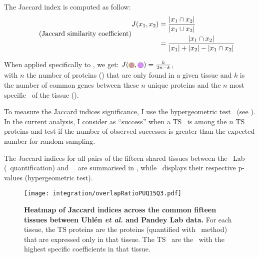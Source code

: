 \begin{minipage}{\textwidth}
    The Jaccard index is computed as follow:
\begin{equation}
    \tag{Jaccard similarity coefficient}\label{eq:Jaccard}
    \begin{split}
        J(x_{1},x_{2}) & = \frac{\left | x_{1}\cap  x_{2}\right |}%
                                {\left | x_{1}\cup  x_{2}\right |}\\
                       & = \frac{\left | x_{1}\cap  x_{2}\right |}%
                                {\left | x_{1} \right | + \left | x_{2} \right |%
                                - \left | x_{1}\cap  x_{2}\right |}\\
    \end{split}
    \raisetag{6cm}
\end{equation}

When applied specifically to , we get:
$J(\tikzcircle[Tan,fill={rgb,255:red,195; green,160;blue,153}]{4pt},%
\tikzcircle[DarkOrchid,fill={rgb,255:red,215; green,145; blue,254}]{4pt}) = \frac{k}{2n-k}$,\\
with $n$ the number of proteins (\tikzcircle[Tan,fill={rgb,255:red,195; green,160;blue,153}]{4pt})
that are only found in a given tissue and
$k$ is the number of common genes between
these $n$ unique proteins
and the $n$ most specific \mRNAs\ of the tissue
(\tikzcircle[DarkOrchid,fill={rgb,255:red,215; green,145; blue,254}]{4pt}).
\end{minipage}

\vspace{3mm}
To measure the Jaccard indices significance,
I use the hypergeometric test~
(see ).
In the current analysis,
I consider as \enquote{success} when a \gls{TS} \mRNA\ is among the $n$ \gls{TS} proteins
and test if the number of observed successes is greater than
the expected number for random sampling.\mybr\

\vspace{3mm}
The Jaccard indices for all pairs of the fifteen shared tissues
between the \pandey\ Lab (\PPKM\ quantification) and \uhlen\ \etal\
are summarised in ,
while~ displays
their respective p-values (hypergeometric test).\mybr\

\begin{figure}[!ht]
    \texttt{[image: integration/overlapRatioPUQ15Q3.pdf]}\centering
    \caption[Heatmap of Jaccard indices across 15 tissues]{%
\label{fig:JaccardIndexes}\label{fig:RatioJac}\textbf{Heatmap of Jaccard indices
across the common fifteen tissues between Uhlén \textit{et al.} and Pandey Lab data.}
For each tissue, the \gls{TS} proteins are the proteins
(quantified with \PPKM\ method) that are expressed only in that tissue.
The \gls{TS} \mRNAs\ are the \mRNAs\ with the highest specific coefficients
in that tissue.}
\end{figure}

